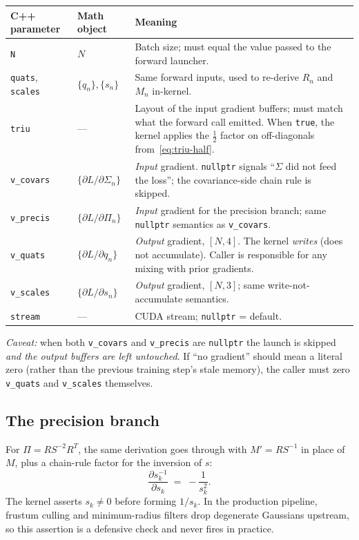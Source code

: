 \documentclass[11pt]{article}
\begin{document}
\begin{center}
\begin{tabular}{l l p{8.0cm}}
\hline
\textbf{C++ parameter} & \textbf{Math object} & \textbf{Meaning} \\
\hline
\texttt{N} & $N$ &
Batch size; must equal the value passed to the forward launcher. \\
\texttt{quats}, \texttt{scales} & $\{q_n\}, \{s_n\}$ &
Same forward inputs, used to re-derive $R_n$ and $M_n$ in-kernel. \\
\texttt{triu} & --- &
Layout of the input gradient buffers; must match what the forward call
emitted. When \texttt{true}, the kernel applies the $\tfrac{1}{2}$
factor on off-diagonals from~\eqref{eq:triu-half}. \\
\texttt{v\_covars} & $\{ \partial L / \partial \Sigma_n \}$ &
\emph{Input} gradient. \texttt{nullptr} signals ``$\Sigma$ did not feed
the loss''; the covariance-side chain rule is skipped. \\
\texttt{v\_precis} & $\{ \partial L / \partial \Pi_n \}$ &
\emph{Input} gradient for the precision branch; same \texttt{nullptr}
semantics as \texttt{v\_covars}. \\
\texttt{v\_quats} & $\{ \partial L / \partial q_n \}$ &
\emph{Output} gradient, $[N, 4]$. The kernel \emph{writes} (does not
accumulate). Caller is responsible for any mixing with prior gradients. \\
\texttt{v\_scales} & $\{ \partial L / \partial s_n \}$ &
\emph{Output} gradient, $[N, 3]$; same write-not-accumulate semantics. \\
\texttt{stream} & --- &
CUDA stream; \texttt{nullptr} = default. \\
\hline
\end{tabular}
\end{center}

\noindent
\emph{Caveat:} when both \texttt{v\_covars} and \texttt{v\_precis} are
\texttt{nullptr} the launch is skipped \emph{and the output buffers are
left untouched}. If ``no gradient'' should mean a literal zero
(rather than the previous training step's stale memory), the caller
must zero \texttt{v\_quats} and \texttt{v\_scales} themselves.

\subsection{The precision branch}

For $\Pi = R S^{-2} R^{T}$, the same derivation goes through with
$M' = R S^{-1}$ in place of $M$, plus a chain-rule factor for the
inversion of $s$:
\begin{equation}
  \frac{\partial s_{k}^{-1}}{\partial s_{k}} \;=\; -\frac{1}{s_{k}^{2}}.
\end{equation}
The kernel asserts $s_{k} \neq 0$ before forming $1 / s_{k}$. In the
production pipeline, frustum culling and minimum-radius filters drop
degenerate Gaussians upstream, so this assertion is a defensive
check and never fires in practice.
\end{document}
